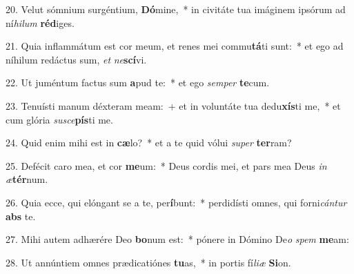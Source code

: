 20. Velut sómnium surgéntium, \textbf{Dó}mine,~* in civitáte tua imáginem ipsórum ad ní\textit{hi}\textit{lum} \textbf{réd}iges.

21. Quia inflammátum est cor meum, et renes mei commu\textbf{tá}ti sunt:~* et ego ad níhilum redáctus sum, \textit{et} \textit{ne}\textbf{scí}vi.

22. Ut juméntum factus sum \textbf{a}pud te:~* et ego \textit{sem}\textit{per} \textbf{te}cum.

23. Tenuísti manum déxteram meam:~+ et in voluntáte tua dedu\textbf{xís}ti me,~* et cum glória \textit{su}\textit{sce}\textbf{pís}ti me.

24. Quid enim mihi est in \textbf{cæ}lo?~* et a te quid vólui \textit{su}\textit{per} \textbf{ter}ram?

25. Defécit caro mea, et cor \textbf{me}um:~* Deus cordis mei, et pars mea Deus \textit{in} \textit{æ}\textbf{tér}num.

26. Quia ecce, qui elóngant se a te, per\textbf{í}bunt:~* perdidísti omnes, qui forni\textit{cán}\textit{tur} \textbf{abs} te.

27. Mihi autem adhærére Deo \textbf{bo}num est:~* pónere in Dómino De\textit{o} \textit{spem} \textbf{me}am:

28. Ut annúntiem omnes prædicatiónes \textbf{tu}as,~* in portis fí\textit{li}\textit{æ} \textbf{Si}on.